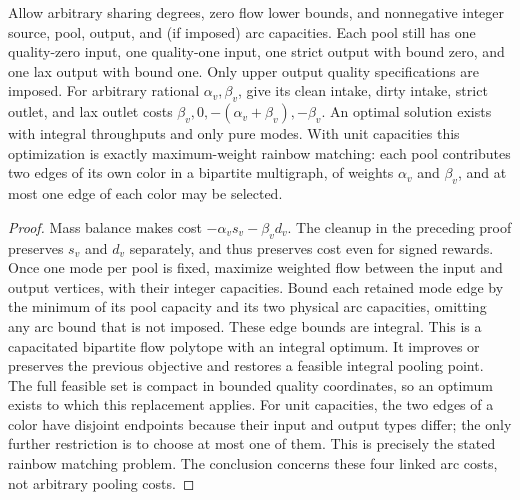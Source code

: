 \begin{proposition}\label{s3:weighted}
Allow arbitrary sharing degrees, zero flow lower bounds, and nonnegative
integer source, pool, output, and (if imposed) arc capacities. Each pool
still has one quality-zero input, one
quality-one input, one strict output with bound zero, and one lax output
with bound one. Only upper output quality specifications are imposed.
For arbitrary rational $\alpha_v,\beta_v$, give its clean
intake, dirty intake, strict outlet, and lax outlet costs
$\beta_v,0,-(\alpha_v+\beta_v),-\beta_v$. An optimal solution exists
with integral throughputs and only pure modes. With unit capacities
this optimization is exactly maximum-weight rainbow matching: each
pool contributes two edges of its own color in a bipartite multigraph, of weights $\alpha_v$
and $\beta_v$, and at most one edge of each color may be selected.
\end{proposition}
\begin{proof}
Mass balance makes cost $-\alpha_vs_v-\beta_vd_v$. The cleanup in the
preceding proof preserves $s_v$ and $d_v$ separately, and thus preserves
cost even for signed rewards. Once one mode per pool is fixed, maximize
weighted flow between the input and output vertices, with their integer
capacities. Bound each retained mode edge by the minimum of its pool
capacity and its two physical arc capacities, omitting any arc bound
that is not imposed. These edge bounds are integral. This is a capacitated
bipartite flow polytope with an integral optimum. It improves or preserves
the previous objective and restores a feasible integral pooling point.
The full feasible set is compact in bounded quality coordinates, so an
optimum exists to which this replacement applies. For unit capacities,
the two edges of a color have disjoint endpoints because their input and
output types differ; the only further restriction is to choose at most
one of them. This is precisely the stated rainbow matching problem.
The conclusion concerns these four linked arc costs, not arbitrary
pooling costs.
\end{proof}

